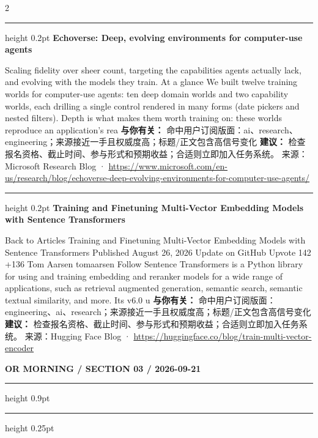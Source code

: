 \documentclass[10.5pt]{ctexart}
\begin{document}
\begin{multicols}{2}
\vspace{2mm}
\hrule height 0.2pt
\vspace{2mm}
{\large\bfseries Echoverse: Deep, evolving environments for computer-use agents}\par
Scaling fidelity over sheer count, targeting the capabilities agents actually lack, and evolving with the models they train. At a glance We built twelve training worlds for computer-use agents: ten deep domain worlds and two capability worlds, each drilling a single control rendered in many forms (date pickers and nested filters). Depth is what makes them worth training on: these worlds reproduce an application’s rea
\textbf{与你有关：} 命中用户订阅版面：ai、research、engineering；来源接近一手且权威度高；标题/正文包含高信号变化
\textbf{建议：} 检查报名资格、截止时间、参与形式和预期收益；合适则立即加入任务系统。
{\footnotesize\color{ormuted} 来源：Microsoft Research Blog · \url{https://www.microsoft.com/en-us/research/blog/echoverse-deep-evolving-environments-for-computer-use-agents/}}
\vspace{2mm}
\hrule height 0.2pt
\vspace{2mm}
{\large\bfseries Training and Finetuning Multi-Vector Embedding Models with Sentence Transformers}\par
Back to Articles Training and Finetuning Multi-Vector Embedding Models with Sentence Transformers Published August 26, 2026 Update on GitHub Upvote 142 +136 Tom Aarsen tomaarsen Follow Sentence Transformers is a Python library for using and training embedding and reranker models for a wide range of applications, such as retrieval augmented generation, semantic search, semantic textual similarity, and more. Its v6.0 u
\textbf{与你有关：} 命中用户订阅版面：engineering、ai、research；来源接近一手且权威度高；标题/正文包含高信号变化
\textbf{建议：} 检查报名资格、截止时间、参与形式和预期收益；合适则立即加入任务系统。
{\footnotesize\color{ormuted} 来源：Hugging Face Blog · \url{https://huggingface.co/blog/train-multi-vector-encoder}}
\end{multicols}
\newpage
{\small\bfseries OR MORNING / SECTION 03 / 2026-09-21}
\vspace{2mm}
\hrule height 0.9pt
\vspace{1.5mm}
\hrule height 0.25pt
\vspace{4mm}
\end{document}

